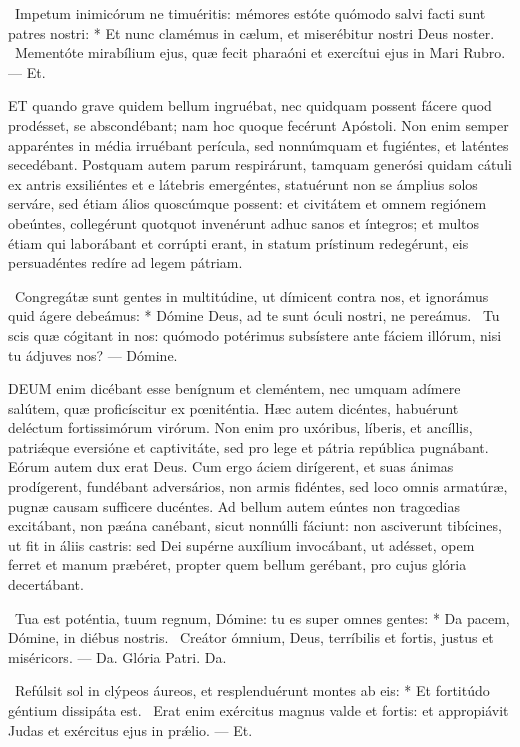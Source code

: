 \R\ Impetum inimicórum ne timuéritis: mémores estóte quómodo salvi facti sunt patres nostri: * Et nunc clamémus in cælum, et miserébitur nostri Deus noster. \V\ Mementóte mirabílium ejus, quæ fecit pharaóni et exercítui ejus in Mari Rubro. — Et.


\lettrine[lines=2]{E}{T} quando grave quidem bellum ingruébat, nec quidquam possent fácere quod prodésset, se abscondébant; nam hoc quoque fecérunt Apóstoli. Non enim semper apparéntes in média irruébant perícula, sed nonnúmquam et fugiéntes, et laténtes secedébant. Postquam autem parum respirárunt, tamquam generósi quidam cátuli ex antris exsiliéntes et e látebris emergéntes, statuérunt non se ámplius solos serváre, sed étiam álios quoscúmque possent: et civitátem et omnem regiónem obeúntes, collegérunt quotquot invenérunt adhuc sanos et íntegros; et multos étiam qui laborábant et corrúpti erant, in statum prístinum redegérunt, eis persuadéntes redíre ad legem pátriam.

\R\ Congregátæ sunt gentes in multitúdine, ut dímicent contra nos, et ignorámus quid ágere debeámus: * Dómine Deus, ad te sunt óculi nostri, ne pereámus. \V\ Tu scis quæ cógitant in nos: quómodo potérimus subsístere ante fáciem illórum, nisi tu ádjuves nos? — Dómine.


\lettrine[lines=2]{D}{EUM} enim dicébant esse benígnum et cleméntem, nec umquam adímere salútem, quæ proficíscitur ex pœniténtia. Hæc autem dicéntes, habuérunt deléctum fortissimórum virórum. Non enim pro uxóribus, líberis, et ancíllis, patriǽque eversióne et captivitáte, sed pro lege et pátria república pugnábant. Eórum autem dux erat Deus. Cum ergo áciem dirígerent, et suas ánimas prodígerent, fundébant adversários, non armis fidéntes, sed loco omnis armatúræ, pugnæ causam sufficere ducéntes. Ad bellum autem eúntes non tragœdias excitábant, non pæána canébant, sicut nonnúlli fáciunt: non asciverunt tibícines, ut fit in áliis castris: sed Dei supérne auxílium invocábant, ut adésset, opem ferret et manum præbéret, propter quem bellum gerébant, pro cujus glória decertábant.

\R\ Tua est poténtia, tuum regnum, Dómine: tu es super omnes gentes: * Da pacem, Dómine, in diébus nostris. \V\ Creátor ómnium, Deus, terríbilis et fortis, justus et miséricors. — Da. Glória Patri. Da.

\R\ Refúlsit sol in clýpeos áureos, et resplenduérunt montes ab eis: * Et fortitúdo géntium dissipáta est. \V\ Erat enim exércitus magnus valde et fortis: et appropiávit Judas et exércitus ejus in prǽlio. — Et.

